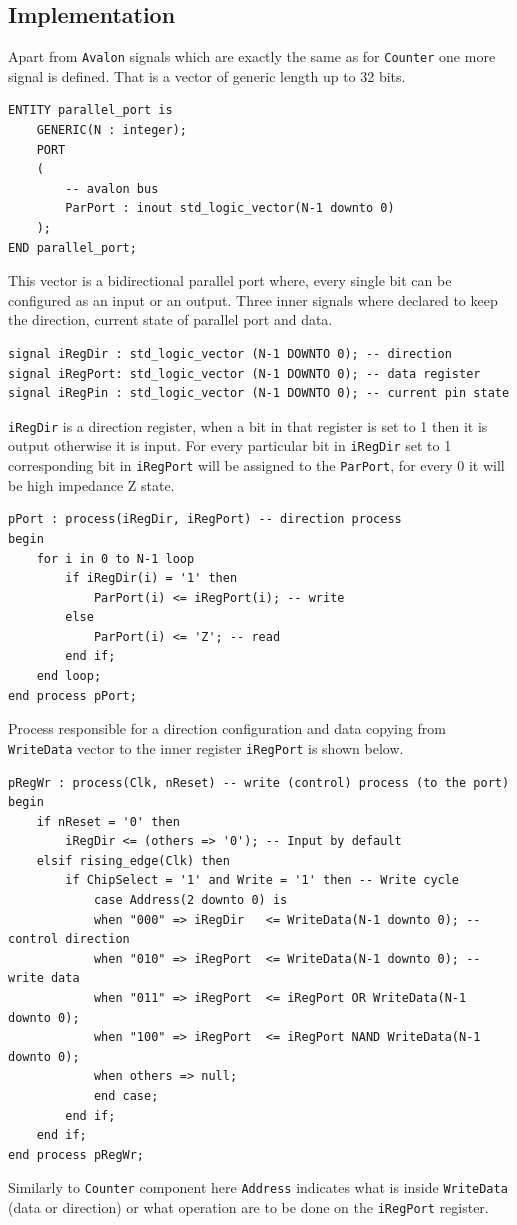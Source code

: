 \subsection{Implementation}
Apart from \verb|Avalon| signals which are exactly the same as for \verb|Counter| one more signal is defined. That is a vector of generic length up to 32 bits. 
\begin{verbatim}
ENTITY parallel_port is 
    GENERIC(N : integer);
    PORT
    (
        -- avalon bus
        ParPort : inout std_logic_vector(N-1 downto 0)
    );
END parallel_port;
\end{verbatim}
This vector is a bidirectional parallel port where, every single bit can be configured as an input or an output. Three inner signals where declared to keep the direction, current state of parallel port and data.
\begin{verbatim}
signal iRegDir : std_logic_vector (N-1 DOWNTO 0); -- direction
signal iRegPort: std_logic_vector (N-1 DOWNTO 0); -- data register 
signal iRegPin : std_logic_vector (N-1 DOWNTO 0); -- current pin state
\end{verbatim}
\verb|iRegDir| is a direction register, when a bit in that register is set to 1 then it is output otherwise it is input. For every particular bit in \verb|iRegDir| set to 1 corresponding bit in \verb|iRegPort| will be assigned to the \verb|ParPort|, for every 0 it will be high impedance Z state.
\begin{verbatim}
pPort : process(iRegDir, iRegPort) -- direction process
begin
    for i in 0 to N-1 loop
        if iRegDir(i) = '1' then
            ParPort(i) <= iRegPort(i); -- write
        else
            ParPort(i) <= 'Z'; -- read
        end if;
    end loop;
end process pPort;
\end{verbatim}
Process responsible for a direction configuration and data copying from \verb|WriteData| vector to the inner register \verb|iRegPort| is shown below.
\begin{verbatim}
pRegWr : process(Clk, nReset) -- write (control) process (to the port)
begin
    if nReset = '0' then
        iRegDir <= (others => '0'); -- Input by default
    elsif rising_edge(Clk) then
        if ChipSelect = '1' and Write = '1' then -- Write cycle
            case Address(2 downto 0) is
            when "000" => iRegDir   <= WriteData(N-1 downto 0); -- control direction
            when "010" => iRegPort  <= WriteData(N-1 downto 0); -- write data
            when "011" => iRegPort  <= iRegPort OR WriteData(N-1 downto 0);
            when "100" => iRegPort  <= iRegPort NAND WriteData(N-1 downto 0);
            when others => null;
            end case;
        end if;
    end if;
end process pRegWr;
\end{verbatim}
Similarly to \verb|Counter| component here \verb|Address| indicates what is inside \verb|WriteData| (data or direction) or what operation are to be done on the \verb|iRegPort| register. 

